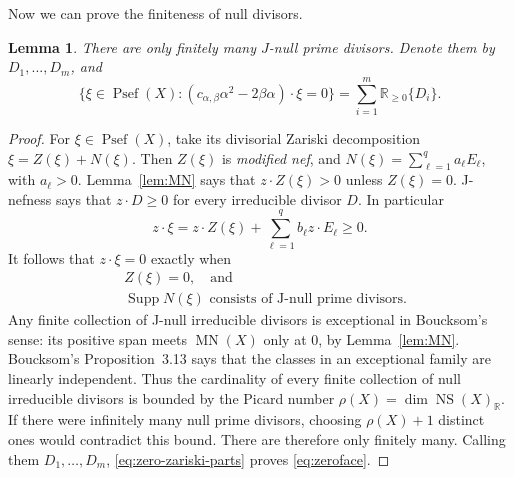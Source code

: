 \documentclass[reqno]{amsart}
\theoremstyle{remark}
\def\R{\mathbb{R}}
\newcommand{\Psef}{\operatorname{Psef}}
\newcommand{\MN}{\operatorname{MN}}
\newcommand{\NS}{\operatorname{NS}}
\theoremstyle{plain}
\newtheorem{lemma}[thm]{Lemma}
\begin{document}
Now we can prove the finiteness of null divisors. 
\begin{lemma}\label{lem:finite-null-divisor}
There are only finitely many $J$-null prime divisors. Denote them by $D_1,...,D_m$, and
\begin{equation}\label{eq:zeroface}
 \{\xi\in\Psef(X):(c_{\alpha,\beta}\alpha^2-2\beta\alpha)\cdot\xi=0\}
 =\sum_{i=1}^m\R_{\geq0}\{D_i\}.
\end{equation}
\end{lemma}
\begin{proof}
    For $\xi\in \Psef(X)$, take its divisorial Zariski decomposition $\xi=Z(\xi)+N(\xi).$ Then $Z(\xi)$ is \emph{modified nef}, and $N(\xi)=\sum_{\ell=1}^q a_\ell E_\ell$, with $a_\ell>0$. Lemma~\ref{lem:MN} says that $z\cdot Z(\xi)>0$ unless $Z(\xi)=0$.  J-nefness says that $z\cdot D\geq 0$ for every irreducible divisor $D$. In particular \[
    z\cdot \xi=z\cdot Z(\xi)+\sum_{\ell=1}^qb_\ell z\cdot E_\ell\geq 0.
    \]
    It follows that
$z\cdot\xi=0$ exactly when
\begin{equation}\label{eq:zero-zariski-parts}
 \begin{aligned}
  &Z(\xi)=0,\quad\text{and}\\
  &\operatorname{Supp}N(\xi)
    \text{ consists of J-null prime divisors}.
 \end{aligned}
\end{equation}
Any finite collection of J-null irreducible divisors is exceptional in
Boucksom's sense: its positive span meets $\MN(X)$ only at $0$, by
Lemma~\ref{lem:MN}.  Boucksom's Proposition~3.13 says that the classes in
an exceptional family are linearly independent.  Thus the cardinality of
every finite collection of null irreducible divisors is bounded by the Picard
number $\rho(X)=\dim\NS(X)_\R$.  If there were infinitely many null
prime divisors, choosing $\rho(X)+1$ distinct ones would contradict this
bound.  There are therefore only finitely many.  Calling them
$D_1,\ldots,D_m$, \eqref{eq:zero-zariski-parts} proves
\eqref{eq:zeroface}.
\end{proof}
\end{document}
